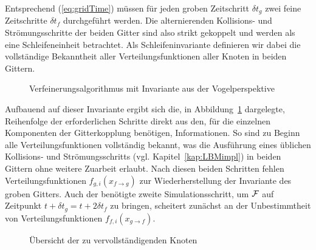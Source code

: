 \bigskip

Entsprechend (\ref{eq:gridTime}) müssen für jeden groben Zeitschritt \(\delta t_g\) zwei feine Zeitschritte \(\delta t_f\) durchgeführt werden. Die alternierenden Kollisions- und Strömungsschritte der beiden Gitter sind also strikt gekoppelt und werden als eine Schleifeneinheit betrachtet. Als Schleifeninvariante definieren wir dabei die vollständige Bekanntheit aller Verteilungsfunktionen aller Knoten in beiden Gittern.

\begin{figure}[h]

\caption{Verfeinerungsalgorithmus mit Invariante aus der Vogelperspektive}
\label{fig:AlgorithmBirdsEye}
\end{figure}
\noindent
Aufbauend auf dieser Invariante ergibt sich die, in Abbildung~\ref{fig:AlgorithmBirdsEye} dargelegte, Reihenfolge der erforderlichen Schritte direkt aus den, für die einzelnen Komponenten der Gitterkopplung benötigen, Informationen. So sind zu Beginn alle Verteilungsfunktionen vollständig bekannt, was die Ausführung eines üblichen Kollisions- und Strömungsschritts (vgl. Kapitel~\ref{kap:LBMimpl}) in beiden Gittern ohne weitere Zuarbeit erlaubt. Nach diesen beiden Schritten fehlen Verteilungsfunktionen \(f_{g,i}(x_{f \to g})\) zur Wiederherstellung der Invariante des groben Gitters. Auch der benötigte zweite Simulationsschritt, um \(\mathcal{F}\) auf Zeitpunkt \(t+\delta t_g=t+2\delta t_f\) zu bringen, scheitert zunächst an der Unbestimmtheit von Verteilungsfunktionen \(f_{f,i}(x_{g \to f})\).

\begin{figure}[h]
\centering

\caption{Übersicht der zu vervollständigenden Knoten}
\end{figure}

